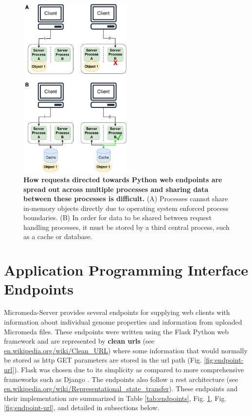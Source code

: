 \begin{figure}[!ht]
  \centering
	\includegraphics[width=0.50\textwidth]{media/Client-Processing.pdf}
	 \caption[How requests directed towards Python web endpoints are spread out across 
multiple processes and sharing data between these processes is 
difficult.]{\textbf{How requests directed towards Python web endpoints are spread 
out across multiple processes and sharing data between these processes is 
difficult.} (A) Processes cannot share in-memory objects directly due to 
operating system enforced process boundaries. (B) In order for data to be shared 
between request handling processes, it must be stored by a third central 
process, such as a cache or database.}
	 \label{fig:client-processing}
\end{figure}

\FloatBarrier
\section{Application Programming Interface Endpoints} \label{endpoints}

Micromeda-Server provides several endpoints for supplying web clients with 
information about individual genome properties and information from uploaded 
Micromeda files. These endpoints were written using the Flask Python web 
framework \cite{grinberg2018flask} and are represented by \textbf{clean 
\gls{url}s} (see 
\href{http://en.wikipedia.org/wiki/Clean_URL}{en.wikipedia.org/wiki/Clean\_URL}) 
where some information that would normally be stored as \gls{http} GET 
parameters are stored in the \gls{url} path (Fig. \ref{fig:endpoint-url}). Flask 
was chosen due to its simplicity as compared to more comprehensive frameworks 
such as Django \cite{holovaty2009definitive}. The endpoints also follow a 
\gls{rest} architecture \cite{fielding2000representational} (see 
\href{http://en.wikipedia.org/wiki/Representational_state_transfer}{en.wikipedia.org/wiki/Representational\_state\_transfer}). 
These endpoints and their implementation are summarized in Table 
\ref{tab:endpoints}, Fig. \ref{endpoints}, Fig. \ref{fig:endpoint-url}, and 
detailed in subsections below.

